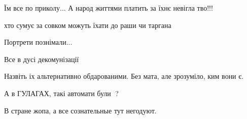 \begin{itemize}
Їм все по приколу...
А народ життями платить за їхнє невігла тво!!!

 
хто сумує за совком можуть їхати до раши чи таргана

 
Портрети познімали...

 
Все в дусі декомунізації

 
Назвіть іх альтернативно обдарованими. Без мата, але зрозуміло, ким вони є.

 
А в ГУЛАГАХ, такі автомати були 🤔?

 
В стране жопа, а все сознательные тут негодуют.

 

\end{itemize}
